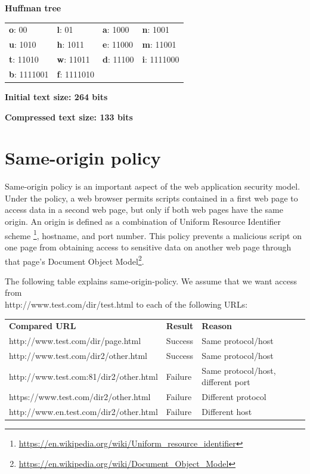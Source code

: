 \centerline{\textbf{Huffman tree}}

\begin{table}[H] \centering \begin{tabular}{ | l | l | l | l | } \hline
\textbf{o}: 00 & \textbf{l}: 01 & \textbf{a}: 1000 & \textbf{n}: 1001 \\
\textbf{u}: 1010 & \textbf{h}: 1011 & \textbf{e}: 11000 & \textbf{m}: 11001 \\
\textbf{t}: 11010 & \textbf{w}: 11011 & \textbf{d}: 11100 & \textbf{i}: 1111000
\\ \textbf{b}: 1111001 & \textbf{f}: 1111010 & \textbf{}  & \textbf{}
\\ \hline \end{tabular} \end{table}

\centerline{\textbf{Initial text size: 264 bits}} \centerline{\textbf{Compressed
text size: 133 bits}}


\section{Same-origin policy}\label{sec:sameorigin}

Same-origin policy is an important aspect of the web application security model. 
Under the policy, a web browser permits scripts contained in a first web page 
to access data in a second web page, but only if both web pages have the same 
origin. An origin is defined as a combination of Uniform Resource Identifier scheme
\footnote{\url{https://en.wikipedia.org/wiki/Uniform_resource_identifier}}, hostname,
and port number. This policy prevents a malicious script on one page from obtaining
access to sensitive  data on another web page through that page's Document Object
Model\footnote{\url{https://en.wikipedia.org/wiki/Document_Object_Model}}.

The following table explains same-origin-policy. We assume that we want access from \\
http://www.test.com/dir/test.html to each of the following URLs:


\begin{table}[H] \centering \begin{tabular}{ | l | l | l | } \hline
\textbf{Compared URL} & \textbf{Result} & \textbf{Reason}   \\
http://www.test.com/dir/page.html & Success & Same protocol/host \\
http://www.test.com/dir2/other.html & Success & Same protocol/host \\
http://www.test.com:81/dir2/other.html & Failure & Same protocol/host, different port \\
https://www.test.com/dir2/other.html & Failure & Different protocol \\
http://www.en.test.com/dir2/other.html & Failure & Different host \\
\hline \end{tabular} \end{table}


